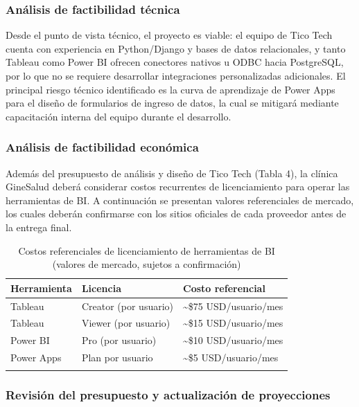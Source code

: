 \documentclass[12pt,letterpaper]{article}
\begin{document}
\subsubsection*{Análisis de factibilidad técnica}

Desde el punto de vista técnico, el proyecto es viable: el equipo de Tico Tech cuenta con
experiencia en Python/Django y bases de datos relacionales, y tanto Tableau como Power BI
ofrecen conectores nativos u ODBC hacia PostgreSQL, por lo que no se requiere
desarrollar integraciones personalizadas adicionales. El principal riesgo técnico identificado
es la curva de aprendizaje de Power Apps para el diseño de formularios de ingreso de
datos, la cual se mitigará mediante capacitación interna del equipo durante el desarrollo.

\subsubsection*{Análisis de factibilidad económica}

Además del presupuesto de análisis y diseño de Tico Tech (Tabla 4), la clínica GineSalud
deberá considerar costos recurrentes de licenciamiento para operar las herramientas de BI.
A continuación se presentan valores referenciales de mercado, los cuales deberán
confirmarse con los sitios oficiales de cada proveedor antes de la entrega final.

\begin{xltabular}{\textwidth}{|p{2.8cm}|X|X|}
\hline
{}
\textbf{Herramienta} & \textbf{Licencia} & \textbf{Costo referencial} \\
\hline
\endhead
Tableau & Creator (por usuario) & \textasciitilde \$75 USD/usuario/mes \\
\hline
Tableau & Viewer (por usuario) & \textasciitilde \$15 USD/usuario/mes \\
\hline
Power BI & Pro (por usuario) & \textasciitilde \$10 USD/usuario/mes \\
\hline
Power Apps & Plan por usuario & \textasciitilde \$5 USD/usuario/mes \\
\hline
\caption{Costos referenciales de licenciamiento de herramientas de BI (valores de mercado, sujetos a confirmación)}
\end{xltabular}

\subsubsection*{Revisión del presupuesto y actualización de proyecciones}
\end{document}
